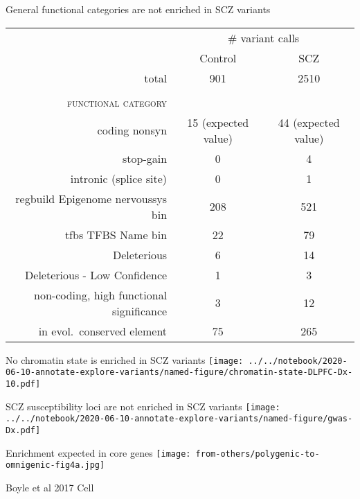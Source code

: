 \documentclass[usenames,dvipsnames]{beamer}
\begin{document}
\begin{frame}{General functional categories are not enriched in SCZ variants}
\small
\begin{tabular}{r|cc}
& \multicolumn{2}{c}{\# variant calls} \\
& Control & SCZ \\
\rowcolor{gray}
total & 901 & 2510 \\
& & \\
\scshape{functional category} & & \\
\rowcolor{GreenYellow}
coding nonsyn & 15 (expected value) & 44 (expected value) \\
\rowcolor{Melon}
stop-gain & 0 & 4 \\
\rowcolor{GreenYellow}
intronic (splice site) & 0 & 1 \\
\rowcolor{Melon}
regbuild Epigenome nervoussys bin & 208 & 521 \\
\rowcolor{GreenYellow}
tfbs TFBS Name bin & 22 & 79 \\
\rowcolor{Melon}
Deleterious & 6 & 14 \\
\rowcolor{GreenYellow}
Deleterious - Low Confidence & 1 & 3 \\
\rowcolor{Melon}
non-coding, high functional significance & 3 & 12 \\
\rowcolor{GreenYellow}
in evol.~conserved element & 75 & 265 \\
\end{tabular}
\end{frame}


\begin{frame}{No chromatin state is enriched in SCZ variants}
\texttt{[image: ../../notebook/2020-06-10-annotate-explore-variants/named-figure/chromatin-state-DLPFC-Dx-10.pdf]}
\end{frame}

\begin{frame}{SCZ susceptibility loci are not enriched in SCZ variants}
\texttt{[image: ../../notebook/2020-06-10-annotate-explore-variants/named-figure/gwas-Dx.pdf]}
\end{frame}

\begin{frame}{Enrichment expected in core genes}
\texttt{[image: from-others/polygenic-to-omnigenic-fig4a.jpg]}

{\tiny Boyle et al 2017 Cell}
\end{frame}
\end{document}
